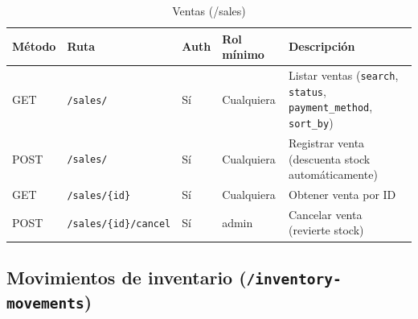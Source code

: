 \begin{longtable}[]{@{}
  >{\raggedright\arraybackslash}p{}
  >{\raggedright\arraybackslash}p{}
  >{\raggedright\arraybackslash}p{}
  >{\raggedright\arraybackslash}p{}
  >{\raggedright\arraybackslash}p{}@{}}
\caption[Ventas (/sales)]{Ventas (/sales)}\tabularnewline
\toprule\noalign{}
\begin{minipage}[b]{\linewidth}\raggedright
Método
\end{minipage} & \begin{minipage}[b]{\linewidth}\raggedright
Ruta
\end{minipage} & \begin{minipage}[b]{\linewidth}\raggedright
Auth
\end{minipage} & \begin{minipage}[b]{\linewidth}\raggedright
Rol mínimo
\end{minipage} & \begin{minipage}[b]{\linewidth}\raggedright
Descripción
\end{minipage} \\
\midrule\noalign{}
\endhead
\bottomrule\noalign{}
\endlastfoot
GET & \texttt{/sales/} & Sí & Cualquiera & Listar ventas (\texttt{search}, \texttt{status}, \texttt{payment\_method}, \texttt{sort\_by}) \\
POST & \texttt{/sales/} & Sí & Cualquiera & Registrar venta (descuenta stock automáticamente) \\
GET & \texttt{/sales/\{id\}} & Sí & Cualquiera & Obtener venta por ID \\
POST & \texttt{/sales/\{id\}/cancel} & Sí & admin & Cancelar venta (revierte stock) \\
\end{longtable}

\subsection{\texorpdfstring{Movimientos de inventario (\texttt{/inventory-movements})}{Movimientos de inventario (/inventory-movements)}}\label{movimientos-de-inventario-inventory-movements}


